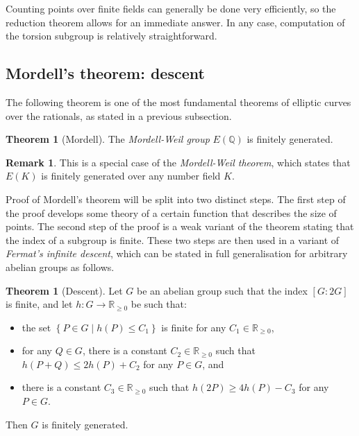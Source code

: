 \documentclass{article}
\newcommand{\Q}{\mathbb{Q}}
\newcommand{\R}{\mathbb{R}}
\newcommand{\rb}[1]{\left( #1 \right)}
\renewcommand{\sb}[1]{\left[ #1 \right]}
\newcommand{\cb}[1]{\left\{ #1 \right\}}
\theoremstyle{definition}
\newtheorem*{remark}{Remark}
\newtheorem{theorem}[proposition]{Theorem}
\begin{document}
Counting points over finite fields can generally be done very efficiently, so the reduction theorem allows for an immediate answer. In any case, computation of the torsion subgroup is relatively straightforward.

\pagebreak

\subsection{Mordell's theorem: descent}

The following theorem is one of the most fundamental theorems of elliptic curves over the rationals, as stated in a previous subsection.

\begin{theorem}[Mordell]
\label{thm:mordell}
The \emph{Mordell-Weil group} $ E\rb{\Q} $ is finitely generated.
\end{theorem}

\begin{remark}
This is a special case of the \emph{Mordell-Weil theorem}, which states that $ E\rb{K} $ is finitely generated over any number field $ K $.
\end{remark}

Proof of Mordell's theorem will be split into two distinct steps. The first step of the proof develops some theory of a certain function that describes the size of points. The second step of the proof is a weak variant of the theorem stating that the index of a subgroup is finite. These two steps are then used in a variant of \emph{Fermat's infinite descent}, which can be stated in full generalisation for arbitrary abelian groups as follows.

\begin{theorem}[Descent]
Let $ G $ be an abelian group such that the index $ \sb{G : 2G} $ is finite, and let $ h : G \to \R_{\ge 0} $ be such that:
\begin{itemize}
\item the set $ \cb{P \in G \mid h\rb{P} \le C_1} $ is finite for any $ C_1 \in \R_{\ge 0} $,
\item for any $ Q \in G $, there is a constant $ C_2 \in \R_{\ge 0} $ such that $ h\rb{P + Q} \le 2h\rb{P} + C_2 $ for any $ P \in G $, and
\item there is a constant $ C_3 \in \R_{\ge 0} $ such that $ h\rb{2P} \ge 4h\rb{P} - C_3 $ for any $ P \in G $.
\end{itemize}
Then $ G $ is finitely generated.
\end{theorem}
\end{document}
